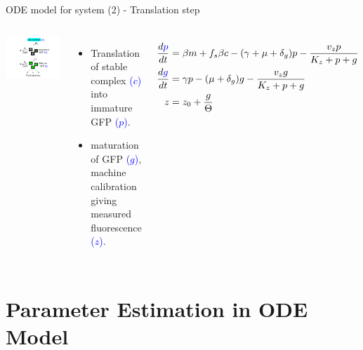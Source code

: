 \documentclass{beamer}
\begin{document}
\begin{frame}{ODE model for system (2) - Translation step}
\begin{columns}
\includegraphics[trim = 0 0 0 0,clip = true,scale = 0.31]{Figures/schematic_translation}
  \begin{itemize}
    \item Translation of stable complex \textcolor{blue}{($c$)} into immature GFP \textcolor{blue}{($p$)}. 
    \item maturation of GFP \textcolor{blue}{($g$)}, machine calibration giving measured fluorescence \textcolor{blue}{($z$)}.
    \end{itemize}
\footnotesize
\begin{align*} 
\frac{d\textcolor{blue}{p}}{dt} & = \beta m +f_{s}\beta c -(\gamma + \mu + \delta_{g})p - \frac{v_{z}p}{K_{z}+p+g}   \\
\frac{d\textcolor{blue}{g}}{dt} & = \gamma p - (\mu + \delta_{g})g - \frac{v_{z}g}{K_{z}+p+g} \\
z &= z_{0} +\frac{g}{\Theta} 
\end{align*}
\end{columns}
\end{frame}

\section{Parameter Estimation in ODE Model}
\end{document}
